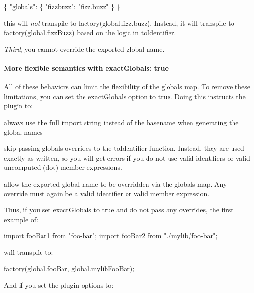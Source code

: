 \begin{DoxyCode}
\{
  "globals": \{
    "fizzbuzz": "fizz.buzz"
  \}
\}
\end{DoxyCode}


this will {\itshape not} transpile to {\ttfamily factory(global.\+fizz.\+buzz)}. Instead, it will transpile to {\ttfamily factory(global.\+fizz\+Buzz)} based on the logic in {\ttfamily to\+Identifier}.

{\itshape Third}, you cannot override the exported global name.

\paragraph*{More flexible semantics with {\ttfamily exact\+Globals\+: true}}

All of these behaviors can limit the flexibility of the {\ttfamily globals} map. To remove these limitations, you can set the {\ttfamily exact\+Globals} option to {\ttfamily true}. Doing this instructs the plugin to\+:


\begin{DoxyEnumerate}
\item always use the full import string instead of the basename when generating the global names
\item skip passing {\ttfamily globals} overrides to the {\ttfamily to\+Identifier} function. Instead, they are used exactly as written, so you will get errors if you do not use valid identifiers or valid uncomputed (dot) member expressions.
\item allow the exported global name to be overridden via the {\ttfamily globals} map. Any override must again be a valid identifier or valid member expression.
\end{DoxyEnumerate}

Thus, if you set {\ttfamily exact\+Globals} to {\ttfamily true} and do not pass any overrides, the first example of\+:


\begin{DoxyCode}
import fooBar1 from "foo-bar";
import fooBar2 from "./mylib/foo-bar";
\end{DoxyCode}


will transpile to\+:


\begin{DoxyCode}
factory(global.fooBar, global.mylibFooBar);
\end{DoxyCode}


And if you set the plugin options to\+:


